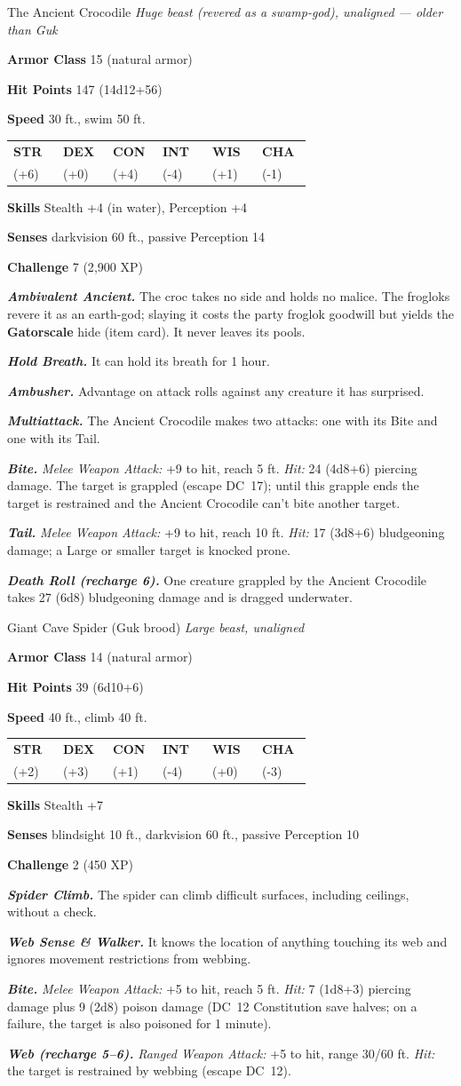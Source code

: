\documentclass[10pt,twoside]{report}
\makeatletter
\newcommand{\msub}[1]{{\itshape #1}\par}
\newcommand{\mrule}{\par\vspace{2pt}{\color{gukred}\rule{\linewidth}{1.1pt}}\par\vspace{2pt}}
\newcommand{\mthin}{\par\vspace{1pt}{\color{gukred!60}\rule{\linewidth}{0.5pt}}\par\vspace{2pt}}
\newcommand{\mfield}[2]{\noindent\textbf{\color{gukred}#1} #2\par}
\newcommand{\mhead}[1]{\par\smallskip{\sffamily\bfseries\scshape\color{gukred}#1}\par
  \vspace{-3pt}{\color{gukred}\rule{\linewidth}{0.7pt}}\par\vspace{2pt}}
\newcommand{\mtrait}[2]{\noindent\textbf{\itshape #1} #2\par\vspace{2pt}}
\newcommand{\abilities}[6]{\par\smallskip\noindent
  {\setlength{\tabcolsep}{1.5pt}%
  \begin{tabular}{@{}*{6}{p{0.15\linewidth}}@{}}
  \centering\sffamily\bfseries\color{gukred}STR &\centering\sffamily\bfseries\color{gukred}DEX
  &\centering\sffamily\bfseries\color{gukred}CON &\centering\sffamily\bfseries\color{gukred}INT
  &\centering\sffamily\bfseries\color{gukred}WIS &\centering\arraybackslash\sffamily\bfseries\color{gukred}CHA\\
  \centering #1 &\centering #2 &\centering #3 &\centering #4 &\centering #5 &\centering\arraybackslash #6\\
  \end{tabular}}\par\smallskip}
\newcommand{\dc}[1]{DC~#1}
\makeatother
\begin{document}
\begin{statblock}{The Ancient Crocodile}
\msub{Huge beast (revered as a swamp-god), unaligned --- \textnormal{older than Guk}}
\mrule
\mfield{Armor Class}{15 (natural armor)}
\mfield{Hit Points}{147 (14d12+56)}
\mfield{Speed}{30 ft., swim 50 ft.}
\abilities{23 (+6)}{10 (+0)}{18 (+4)}{3 (-4)}{13 (+1)}{9 (-1)}
\mthin
\mfield{Skills}{Stealth +4 (in water), Perception +4}
\mfield{Senses}{darkvision 60 ft., passive Perception 14}
\mfield{Challenge}{7 (2{,}900 XP)}
\mrule
\mtrait{Ambivalent Ancient.}{The croc takes no side and holds no malice. The frogloks revere it as an earth-god; slaying it costs the party froglok goodwill but yields the \textbf{Gatorscale} hide (item card). It never leaves its pools.}
\mtrait{Hold Breath.}{It can hold its breath for 1 hour.}
\mtrait{Ambusher.}{Advantage on attack rolls against any creature it has surprised.}
\mhead{Actions}
\mtrait{Multiattack.}{The Ancient Crocodile makes two attacks: one with its Bite and one with its Tail.}
\mtrait{Bite.}{\textit{Melee Weapon Attack:} +9 to hit, reach 5 ft. \textit{Hit:} 24 (4d8+6) piercing damage. The target is grappled (escape \dc{17}); until this grapple ends the target is restrained and the Ancient Crocodile can't bite another target.}
\mtrait{Tail.}{\textit{Melee Weapon Attack:} +9 to hit, reach 10 ft. \textit{Hit:} 17 (3d8+6) bludgeoning damage; a Large or smaller target is knocked prone.}
\mtrait{Death Roll (recharge 6).}{One creature grappled by the Ancient Crocodile takes 27 (6d8) bludgeoning damage and is dragged underwater.}
\end{statblock}

\begin{statblock}{Giant Cave Spider (Guk brood)}
\msub{Large beast, unaligned}
\mrule
\mfield{Armor Class}{14 (natural armor)}
\mfield{Hit Points}{39 (6d10+6)}
\mfield{Speed}{40 ft., climb 40 ft.}
\abilities{14 (+2)}{16 (+3)}{12 (+1)}{2 (-4)}{11 (+0)}{4 (-3)}
\mthin
\mfield{Skills}{Stealth +7}
\mfield{Senses}{blindsight 10 ft., darkvision 60 ft., passive Perception 10}
\mfield{Challenge}{2 (450 XP)}
\mrule
\mtrait{Spider Climb.}{The spider can climb difficult surfaces, including ceilings, without a check.}
\mtrait{Web Sense \& Walker.}{It knows the location of anything touching its web and ignores movement restrictions from webbing.}
\mhead{Actions}
\mtrait{Bite.}{\textit{Melee Weapon Attack:} +5 to hit, reach 5 ft. \textit{Hit:} 7 (1d8+3) piercing damage plus 9 (2d8) poison damage (\dc{12} Constitution save halves; on a failure, the target is also poisoned for 1 minute).}
\mtrait{Web (recharge 5--6).}{\textit{Ranged Weapon Attack:} +5 to hit, range 30/60 ft. \textit{Hit:} the target is restrained by webbing (escape \dc{12}).}
\end{statblock}
\end{document}
